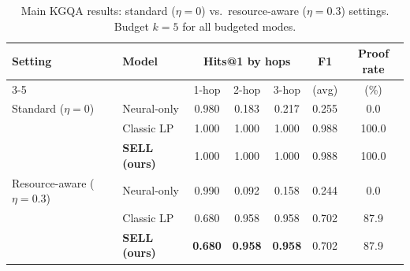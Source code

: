 \begin{table}[t]
\centering
\caption{Main KGQA results: standard ($\eta=0$) vs.\ resource-aware ($\eta=0.3$) settings. Budget $k=5$ for all budgeted modes.}
\label{tab:mainresults}
\small
\begin{tabular}{llccccc}
\toprule
Setting & Model & \multicolumn{3}{c}{Hits@1 by hops} & F1 & Proof rate \\
\cmidrule(lr){3-5}
 & & 1-hop & 2-hop & 3-hop & (avg) & (\%) \\
\midrule
Standard ($\eta{=}0$) & Neural-only & 0.980 & 0.183 & 0.217 & 0.255 & 0.0 \\
 & Classic LP & 1.000 & 1.000 & 1.000 & 0.988 & 100.0 \\
 & \textbf{SELL (ours)} & 1.000 & 1.000 & 1.000 & 0.988 & 100.0 \\
\midrule
Resource-aware ($\eta{=}0.3$) & Neural-only & 0.990 & 0.092 & 0.158 & 0.244 & 0.0 \\
 & Classic LP & 0.680 & 0.958 & 0.958 & 0.702 & 87.9 \\
 & \textbf{SELL (ours)} & \textbf{0.680} & \textbf{0.958} & \textbf{0.958} & 0.702 & 87.9 \\
\bottomrule
\end{tabular}
\end{table}